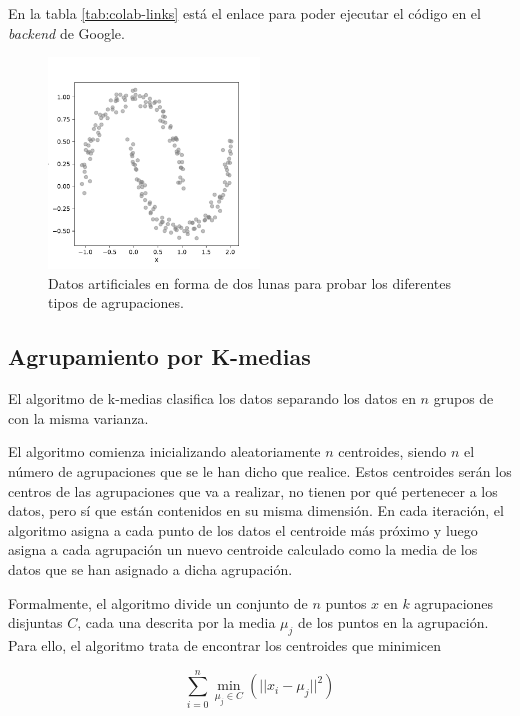 En la tabla \ref{tab:colab-links} está el enlace para poder ejecutar el código en el \textit{backend} de Google.

\begin{figure}[h]
    \centering

    \includegraphics[width=0.5\textwidth]{figures/fake-data.pdf}
    \caption[Datos artificiales]{Datos artificiales en forma de dos lunas para probar los diferentes tipos de agrupaciones.}
    \label{fig:fake-data}

\end{figure}

\subsection{Agrupamiento por K-medias}
El algoritmo de k-medias clasifica los datos separando los datos en $n$ grupos de con la misma varianza.

El algoritmo comienza inicializando aleatoriamente $n$ centroides, siendo $n$ el número de agrupaciones que se le han dicho que realice. Estos centroides serán los centros de las agrupaciones que va a realizar, no tienen por qué pertenecer a los datos, pero sí que están contenidos en su misma dimensión. En cada iteración, el algoritmo asigna a cada punto de los datos el centroide más próximo y luego asigna a cada agrupación un nuevo centroide calculado como la media de los datos que se han asignado a dicha agrupación.

Formalmente, el algoritmo divide un conjunto de $n$ puntos $x$ en $k$ agrupaciones disjuntas $C$, cada una descrita por la media $\mu_j$ de los puntos en la agrupación. Para ello, el algoritmo trata de encontrar los centroides que minimicen

\begin{equation}
  \sum\limits_{i=0}^n \underset{\mu_j \in C}{\operatorname{min}} (|| x_i - \mu_j||^2)
\end{equation}

